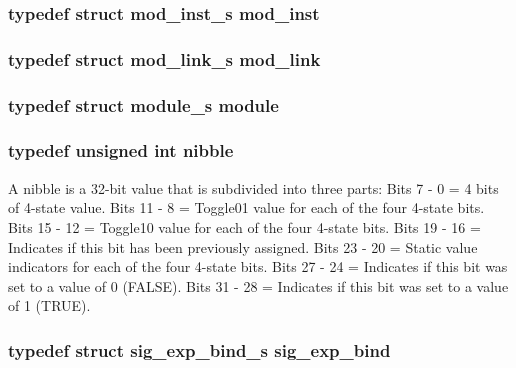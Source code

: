 \subsubsection{\setlength{\rightskip}{0pt plus 5cm}typedef struct {\bf mod\_\-inst\_\-s} mod\_\-inst}\label{defines_8h_a122}


\subsubsection{\setlength{\rightskip}{0pt plus 5cm}typedef struct {\bf mod\_\-link\_\-s} mod\_\-link}\label{defines_8h_a117}


\subsubsection{\setlength{\rightskip}{0pt plus 5cm}typedef struct {\bf module\_\-s} module}\label{defines_8h_a116}


\subsubsection{\setlength{\rightskip}{0pt plus 5cm}typedef unsigned int nibble}\label{defines_8h_a107}


A nibble is a 32-bit value that is subdivided into three parts: Bits 7 - 0 = 4 bits of 4-state value. Bits 11 - 8 = Toggle01 value for each of the four 4-state bits. Bits 15 - 12 = Toggle10 value for each of the four 4-state bits. Bits 19 - 16 = Indicates if this bit has been previously assigned. Bits 23 - 20 = Static value indicators for each of the four 4-state bits. Bits 27 - 24 = Indicates if this bit was set to a value of 0 (FALSE). Bits 31 - 28 = Indicates if this bit was set to a value of 1 (TRUE). 
\subsubsection{\setlength{\rightskip}{0pt plus 5cm}typedef struct {\bf sig\_\-exp\_\-bind\_\-s} sig\_\-exp\_\-bind}\label{defines_8h_a120}


